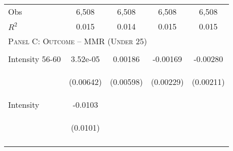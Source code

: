 \begin{subtables}
\begin{table}[htpb!]
\begin{center}
\begin{tabular}{p{5cm}cccc}
Obs	&	6,508	&	6,508	&	6,508	&	6,508	\\  
$R^2$	&	0.015	&	0.014	&	0.015	&	0.015	\\ \midrule
\multicolumn{5}{l}{\textsc{Panel C: Outcome – MMR (Under 25)}}									\\  
\vspace{4pt}	&	\begin{footnotesize}\end{footnotesize}	&	\begin{footnotesize}\end{footnotesize}	&	\begin{footnotesize}\end{footnotesize}	&	\begin{footnotesize}\end{footnotesize}	 \\
Intensity 56-60	&	3.52e-05	&	0.00186	&	-0.00169	&	-0.00280	 \\
	& \begin{footnotesize}	(0.00642)	\end{footnotesize} & \begin{footnotesize}	(0.00598)	\end{footnotesize} & \begin{footnotesize}	(0.00229)	\end{footnotesize} & \begin{footnotesize}	(0.00211)	\end{footnotesize} \\
Intensity  	&	-0.0103	&		&		&		 \\
	& \begin{footnotesize}	(0.0101)	\end{footnotesize} & \begin{footnotesize}		\end{footnotesize} & \begin{footnotesize}		\end{footnotesize} & \begin{footnotesize}		\end{footnotesize} \\
\vspace{4pt}	&	\begin{footnotesize}\end{footnotesize}	&	\begin{footnotesize}\end{footnotesize}	&	\begin{footnotesize}\end{footnotesize}	&	\begin{footnotesize}\end{footnotesize}	 \\

\end{tabular}
\end{center}
\end{table}
\end{subtables}
